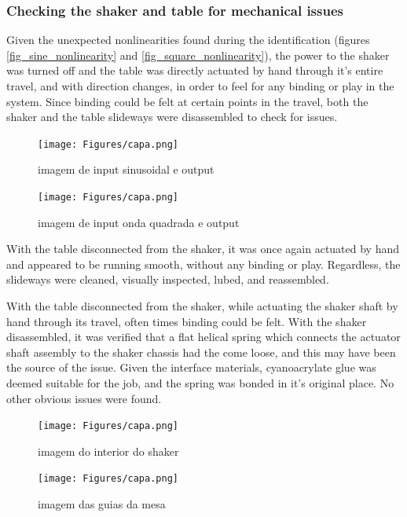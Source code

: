\documentclass[9pt]{extarticle}
\begin{document}
    

\subsubsection{Checking the shaker and table for mechanical issues}

Given the unexpected nonlinearities found during the identification (figures \ref{fig_sine_nonlinearity} and \ref{fig_square_nonlinearity}), the power to the shaker was turned off and the table was directly actuated by hand through it's entire travel, and with direction changes, in order to feel for any binding or play in the system.  Since binding could be felt at certain points in the travel, both the shaker and the table slideways were disassembled to check for issues.

\begin{figure}[H]
\begin{minipage}{0.49\textwidth}
        \centering
    \texttt{[image: Figures/capa.png]}
    \caption{imagem de input sinusoidal e output}
\end{minipage}
\hfill
\begin{minipage}{0.49\textwidth}
    \centering
    \texttt{[image: Figures/capa.png]}
    \caption{imagem de input onda quadrada e output}
\end{minipage}
\end{figure}

With the table disconnected from the shaker, it was once again actuated by hand and appeared to be running smooth, without any binding or play. Regardless, the slideways were cleaned, visually inspected, lubed, and reassembled.

With the table disconnected from the shaker, while actuating the shaker shaft by hand through its travel, often times binding could be felt. With the shaker disassembled, it was verified that a flat helical spring which connects the actuator shaft assembly to the shaker chassis had the come loose, and this may have been the source of the issue. Given the interface materials, cyanoacrylate glue was deemed suitable for the job, and the spring was bonded in it's original place. No other obvious issues were found.

\begin{figure}[H]
\begin{minipage}{0.49\textwidth}
        \centering
    \texttt{[image: Figures/capa.png]}
    \caption{imagem do interior do shaker}
\end{minipage}
\hfill
\begin{minipage}{0.49\textwidth}
    \centering
    \texttt{[image: Figures/capa.png]}
    \caption{imagem das guias da mesa}
\end{minipage}
\end{figure}
\end{document}
